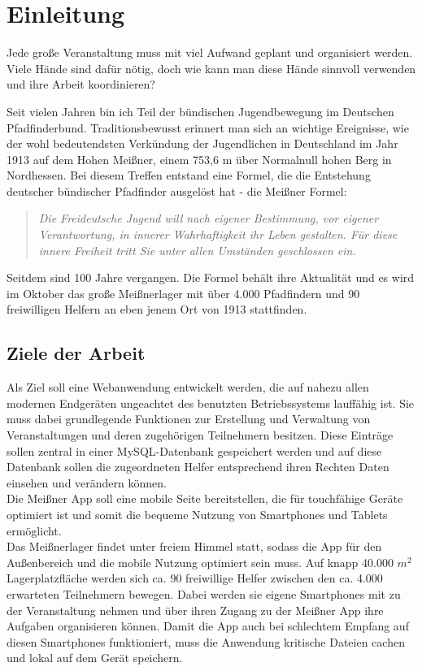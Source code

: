 \chapter{Einleitung}
Jede große Veranstaltung muss mit viel Aufwand geplant und organisiert werden. Viele Hände sind dafür nötig, doch wie kann man diese Hände sinnvoll verwenden und ihre Arbeit koordinieren?\par

Seit vielen Jahren bin ich Teil der bündischen Jugendbewegung im Deutschen Pfadfinderbund. Traditionsbewusst erinnert man sich an wichtige Ereignisse, wie der wohl bedeutendsten Verkündung der Jugendlichen in Deutschland im Jahr 1913 auf dem Hohen Meißner, einem 753,6 m über Normalnull hohen Berg in Nordhessen. Bei diesem Treffen entstand eine Formel, die die Entstehung deutscher bündischer Pfadfinder ausgelöst hat - die Meißner Formel:
\begin{quote}
	\textit{\glqq Die Freideutsche Jugend will nach eigener Bestimmung, vor eigener Verantwortung, in innerer Wahrhaftigkeit ihr Leben gestalten. Für diese innere Freiheit tritt Sie unter allen Umständen geschlossen ein.\grqq{}}\cite[S. 109]{meissnerformel}
\end{quote}
Seitdem sind 100 Jahre vergangen. Die Formel behält ihre Aktualität und es wird im Oktober das große Meißnerlager mit über 4.000 Pfadfindern und 90 freiwilligen Helfern an eben jenem Ort von 1913 stattfinden.

\section{Ziele der Arbeit}
Als Ziel soll eine Webanwendung entwickelt werden, die auf nahezu allen modernen Endgeräten ungeachtet des benutzten Betriebssystems lauffähig ist. Sie muss dabei grundlegende Funktionen zur Erstellung und Verwaltung von Veranstaltungen und deren zugehörigen Teilnehmern besitzen. Diese Einträge sollen zentral in einer MySQL-Datenbank gespeichert werden und auf diese Datenbank sollen die zugeordneten Helfer entsprechend ihren Rechten Daten einsehen und verändern können.\\
Die Meißner App soll eine mobile Seite bereitstellen, die für touchfähige Geräte optimiert ist und somit die bequeme Nutzung von Smartphones und Tablets ermöglicht.\\
Das Meißnerlager findet unter freiem Himmel statt, sodass die App für den Außenbereich und die mobile Nutzung optimiert sein muss. Auf knapp 40.000 $m^2$ Lagerplatzfläche werden sich ca. 90 freiwillige Helfer zwischen den ca. 4.000 erwarteten Teilnehmern bewegen. Dabei werden sie eigene Smartphones mit zu der Veranstaltung nehmen und über ihren Zugang zu der Meißner App ihre Aufgaben organisieren können. Damit die App auch bei schlechtem Empfang auf diesen Smartphones funktioniert, muss die Anwendung kritische Dateien cachen und lokal auf dem Gerät speichern.\par

